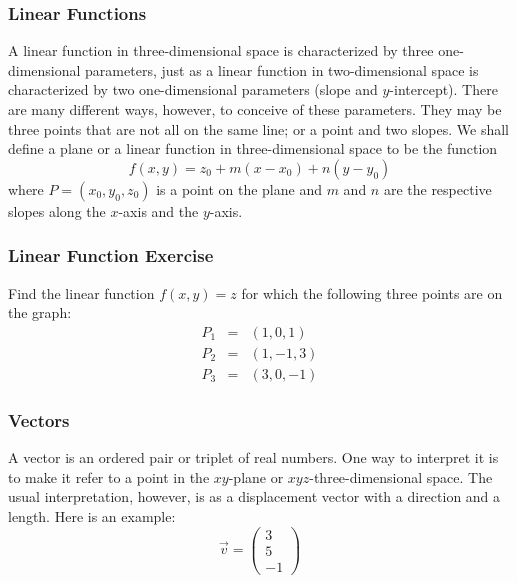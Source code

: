 \documentclass[xcolor=dvipsnames]{beamer}
\begin{document}
\begin{frame}
  \frametitle{Linear Functions}
  A linear function in three-dimensional space is characterized by
  three one-dimensional parameters, just as a linear function in
  two-dimensional space is characterized by two one-dimensional
  parameters (slope and $y$-intercept). There are many different ways,
  however, to conceive of these parameters. They may be three points
  that are not all on the same line; or a point and two slopes. We
  shall define a plane or a linear function in three-dimensional space
  to be the function
  \begin{equation}
    \label{eq:oohuthah}
    f(x,y)=z_{0}+m(x-x_{0})+n(y-y_{0})
  \end{equation}
where $P=(x_{0},y_{0},z_{0})$ is a point on the plane and $m$ and $n$
are the respective slopes along the $x$-axis and the $y$-axis.
\end{frame}

\begin{frame}
  \frametitle{Linear Function Exercise}
  {\ubung} Find the linear function $f(x,y)=z$ for which the following three points are on
  the graph:
  \begin{equation}
    \label{eq:oareequu}
    \begin{array}{rcl}
      P_{1}&=&(1,0,1) \\
      P_{2}&=&(1,-1,3) \\
      P_{3}&=&(3,0,-1)
    \end{array}
  \end{equation}
\end{frame}

\begin{frame}
  \frametitle{Vectors}
  A vector is an ordered pair or triplet of real numbers. One way to interpret it
  is to make it refer to a point in the $xy$-plane or
  $xyz$-three-dimensional space. The usual interpretation, however, is
  as a \alert{displacement vector} with a direction and a length. Here
  is an example:
  \begin{equation}
    \label{eq:lapheeka}
    \vec{v}=\left(
    \begin{array}{c}
      3 \\
      5 \\
      -1
    \end{array}\right)
  \end{equation}
\end{frame}
\end{document}

